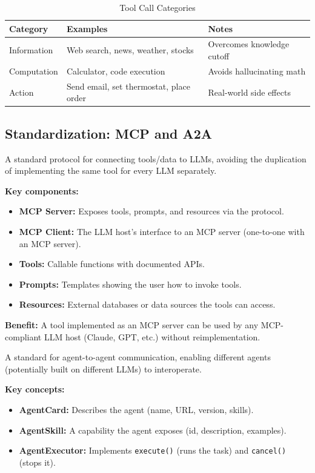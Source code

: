 \documentclass[11pt, a4paper]{article}
\begin{document}
\begin{table}[h]
\centering
\caption{Tool Call Categories}
\begin{tabular}{@{}lll@{}}
\toprule
\textbf{Category} & \textbf{Examples} & \textbf{Notes} \\
\midrule
Information & Web search, news, weather, stocks & Overcomes knowledge cutoff \\
Computation & Calculator, code execution & Avoids hallucinating math \\
Action & Send email, set thermostat, place order & Real-world side effects \\
\bottomrule
\end{tabular}
\end{table}

\subsection{Standardization: MCP and A2A}

\begin{defbox}
A standard protocol for connecting tools/data to LLMs, avoiding the duplication of implementing the same tool for every LLM separately.

\textbf{Key components:}
\begin{itemize}[leftmargin=1.5em]
  \item \textbf{MCP Server:} Exposes tools, prompts, and resources via the protocol.
  \item \textbf{MCP Client:} The LLM host's interface to an MCP server (one-to-one with an MCP server).
  \item \textbf{Tools:} Callable functions with documented APIs.
  \item \textbf{Prompts:} Templates showing the user how to invoke tools.
  \item \textbf{Resources:} External databases or data sources the tools can access.
\end{itemize}
\textbf{Benefit:} A tool implemented as an MCP server can be used by any MCP-compliant LLM host (Claude, GPT, etc.) without reimplementation.
\end{defbox}

\begin{defbox}
A standard for agent-to-agent communication, enabling different agents (potentially built on different LLMs) to interoperate.

\textbf{Key concepts:}
\begin{itemize}[leftmargin=1.5em]
  \item \textbf{AgentCard:} Describes the agent (name, URL, version, skills).
  \item \textbf{AgentSkill:} A capability the agent exposes (id, description, examples).
  \item \textbf{AgentExecutor:} Implements \texttt{execute()} (runs the task) and \texttt{cancel()} (stops it).
\end{itemize}
\end{defbox}
\end{document}
